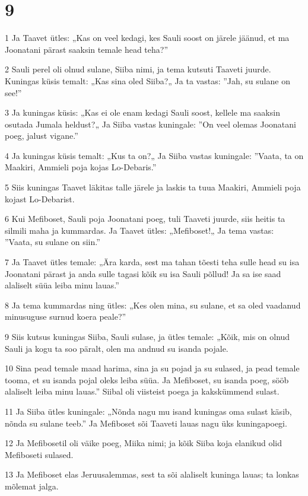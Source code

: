 \chapter{9}

\par 1 Ja Taavet ütles: „Kas on veel kedagi, kes Sauli soost on järele jäänud, et ma Joonatani pärast saaksin temale head teha?”
\par 2 Sauli perel oli olnud sulane, Siiba nimi, ja tema kutsuti Taaveti juurde. Kuningas küsis temalt: „Kas sina oled Siiba?„ Ja ta vastas: ”Jah, su sulane on see!”
\par 3 Ja kuningas küsis: „Kas ei ole enam kedagi Sauli soost, kellele ma saaksin osutada Jumala heldust?„ Ja Siiba vastas kuningale: ”On veel olemas Joonatani poeg, jalust vigane.”
\par 4 Ja kuningas küsis temalt: „Kus ta on?„ Ja Siiba vastas kuningale: ”Vaata, ta on Maakiri, Ammieli poja kojas Lo-Debaris.”
\par 5 Siis kuningas Taavet läkitas talle järele ja laskis ta tuua Maakiri, Ammieli poja kojast Lo-Debarist.
\par 6 Kui Mefiboset, Sauli poja Joonatani poeg, tuli Taaveti juurde, siis heitis ta silmili maha ja kummardas. Ja Taavet ütles: „Mefiboset!„ Ja tema vastas: ”Vaata, su sulane on siin.”
\par 7 Ja Taavet ütles temale: „Ära karda, sest ma tahan tõesti teha sulle head su isa Joonatani pärast ja anda sulle tagasi kõik su isa Sauli põllud! Ja sa ise saad alaliselt süüa leiba minu lauas.”
\par 8 Ja tema kummardas ning ütles: „Kes olen mina, su sulane, et sa oled vaadanud minusuguse surnud koera peale?”
\par 9 Siis kutsus kuningas Siiba, Sauli sulase, ja ütles temale: „Kõik, mis on olnud Sauli ja kogu ta soo päralt, olen ma andnud su isanda pojale.
\par 10 Sina pead temale maad harima, sina ja su pojad ja su sulased, ja pead temale tooma, et su isanda pojal oleks leiba süüa. Ja Mefiboset, su isanda poeg, sööb alaliselt leiba minu lauas.” Siibal oli viisteist poega ja kakskümmend sulast.
\par 11 Ja Siiba ütles kuningale: „Nõnda nagu mu isand kuningas oma sulast käsib, nõnda su sulane teeb.” Ja Mefiboset sõi Taaveti lauas nagu üks kuningapoegi.
\par 12 Ja Mefibosetil oli väike poeg, Miika nimi; ja kõik Siiba koja elanikud olid Mefiboseti sulased.
\par 13 Ja Mefiboset elas Jeruusalemmas, sest ta sõi alaliselt kuninga lauas; ta lonkas mõlemat jalga.

